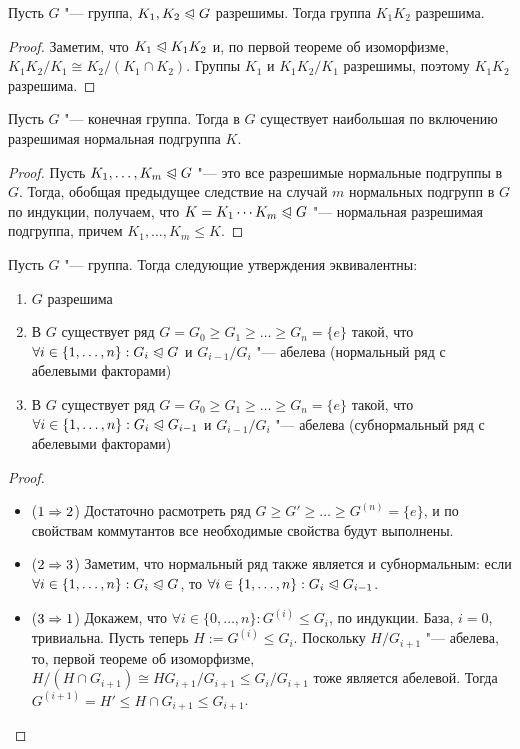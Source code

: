 \begin{corollary}
	Пусть $G$ "--- группа, $K_1, K_2 \trianglelefteqslant G$ разрешимы. Тогда группа $K_1K_2$ разрешима.
\end{corollary}

\begin{proof}
	Заметим, что $K_1 \trianglelefteqslant K_1K_2$ и, по первой теореме об изоморфизме, $K_1K_2/K_1 \cong K_2/(K_1 \cap K_2)$. Группы $K_1$ и $K_1K_2 / K_1$ разрешимы, поэтому $K_1K_2$ разрешима.
\end{proof}

\begin{corollary}
	Пусть $G$ "--- конечная группа. Тогда в $G$ существует наибольшая по включению разрешимая нормальная подгруппа $K$.
\end{corollary}

\begin{proof}
	Пусть $K_1, \dotsc, K_m \trianglelefteqslant G$ "--- это все разрешимые нормальные подгруппы в $G$. Тогда, обобщая предыдущее следствие на случай $m$ нормальных подгрупп в $G$ по индукции, получаем, что $K = K_1\dotsm K_m \trianglelefteqslant G$ "--- нормальная разрешимая подгруппа, причем $K_1, \dotsc, K_m \le K$.
\end{proof}

\begin{theorem}
	Пусть $G$ "--- группа. Тогда следующие утверждения эквивалентны:
	\begin{enumerate}
		\item $G$ разрешима
		\item В $G$ существует ряд $G = G_0 \ge G_1 \ge \dotsc \ge G_n = \{e\}$ такой, что $\forall i \in \{1, \dotsc, n\}: G_i \trianglelefteqslant G$ и $G_{i-1}/G_i$ "--- абелева (нормальный ряд с абелевыми факторами)
		\item В $G$ существует ряд $G = G_0 \ge G_1 \ge \dotsc \ge G_n = \{e\}$ такой, что $\forall i \in \{1, \dotsc, n\}: G_i \trianglelefteqslant G_{i-1}$ и $G_{i-1}/G_i$ "--- абелева (субнормальный ряд с абелевыми факторами)
	\end{enumerate}
\end{theorem}

\begin{proof}~
	\begin{itemize}
		\item ($1 \Rightarrow 2$) Достаточно расмотреть ряд $G \ge G' \ge \dotsc \ge G^{(n)} = \{e\}$, и по свойствам коммутантов все необходимые свойства будут выполнены.
		\item ($2 \Rightarrow 3$) Заметим, что нормальный ряд также является и субнормальным: если $\forall i \hm\in \{1, \dotsc, n\}: G_i \normal G$, то $\forall i \in \{1, \dotsc, n\}: G_i \trianglelefteqslant G_{i-1}$.
		\item ($3 \Rightarrow 1$) Докажем, что $\forall i \in \{0, \dotsc, n\}: G^{(i)} \le G_i$, по индукции. База, $i = 0$, тривиальна. Пусть теперь $H := G^{(i)} \le G_i$. Поскольку $H / G_{i+1}$ "--- абелева, то, первой теореме об изоморфизме, $H/(H \cap G_{i+1}) \cong HG_{i+1}/G_{i+1} \le G_i/G_{i+1}$ тоже является абелевой. Тогда $G^{(i+1)} = H' \le H \cap G_{i+1} \le G_{i+1}$.
	\end{itemize}
\end{proof}

